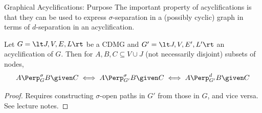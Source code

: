 \begin{frame}{Graphical Acyclifications: Purpose}
The important property of acyclifications is that they can be used to express $\sigma$-separation in a (possibly cyclic) graph
in terms of $d$-separation in an acyclification.
\begin{Prp}
  Let $G = \lt J, V, E, L \rt$ be a CDMG and $G' = \lt J, V, E', L' \rt$ an acyclification of $G$.
  Then for $A, B, C \subseteq V \cup J$ (not necessarily disjoint) subsets of nodes,
  $$A \Perp^\sigma_G B \given C \iff A \Perp^\sigma_{G'} B \given C \iff A \Perp^d_{G'} B \given C$$
\end{Prp}
\begin{proof}
  Requires constructing $\sigma$-open paths in $G'$ from those in $G$, and vice versa. 
  See lecture notes.
\end{proof}
\end{frame}

